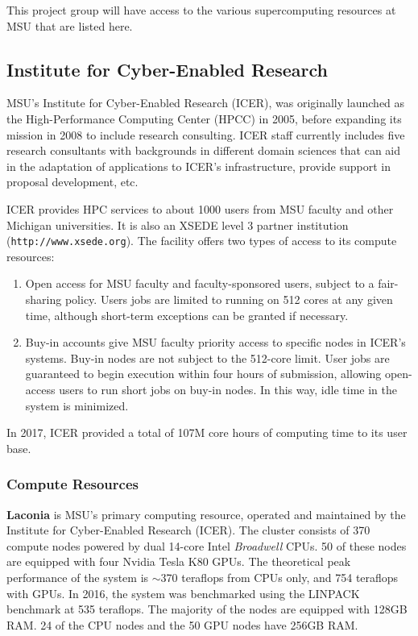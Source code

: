 \documentclass[10pt]{article}
\begin{document}
This project group will have access to the various supercomputing resources at MSU that are listed here.
\subsection{Institute for Cyber-Enabled Research}

MSU's Institute for Cyber-Enabled Research (ICER), was originally launched as
the High-Performance Computing Center (HPCC) in 2005, before expanding
its mission in 2008 to include research consulting. ICER staff currently
includes five research consultants with backgrounds in different domain
sciences that can aid in the adaptation of applications to ICER's
infrastructure, provide support in proposal development, etc.

ICER provides HPC services to about 1000 users from MSU faculty and other
Michigan universities. It is also an XSEDE level 3 partner institution
(\texttt{http://www.xsede.org}). The facility offers two types of access
to its compute resources:
\begin{enumerate}
\item Open access for MSU faculty and faculty-sponsored users, subject to
a fair-sharing policy. Users jobs are limited to running on 512 cores at
any given time, although short-term exceptions can be granted if necessary.
\item Buy-in accounts give MSU faculty priority access to specific nodes
in ICER's systems. Buy-in nodes are not subject to the 512-core limit.
User jobs are guaranteed to begin execution within four hours of submission,
allowing open-access users to run short jobs on buy-in nodes. In this way,
idle time in the system is minimized.
\end{enumerate}
In 2017, ICER provided a total of 107M core hours of computing time to its
user base.

\subsubsection{Compute Resources}
\textbf{Laconia} is MSU's primary computing resource, operated and maintained
by the Institute for Cyber-Enabled Research (ICER). The cluster consists
of 370 compute nodes powered by dual 14-core Intel \emph{Broadwell} CPUs.
50 of these nodes are equipped with four Nvidia Tesla K80 GPUs. The theoretical
peak performance of the system is  $\sim$370 teraflops from CPUs only, and
754 teraflops with GPUs. In 2016, the system was benchmarked using the LINPACK
benchmark at 535 teraflops. The majority of the nodes are equipped with 128GB
RAM. 24 of the CPU nodes and the 50 GPU nodes have 256GB RAM.
\end{document}
